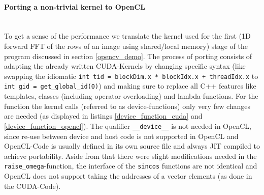 \documentclass[english,11pt,a4paper,table]{article} %
\begin{document}
\paragraph{Porting a non-trivial kernel to OpenCL}\mbox{}\\

To get a sense of the performance we translate the kernel used for the first (1D forward FFT of the rows of an image using shared/local memory) stage of the program discussed in section \ref{opencv_demo}.
The process of porting consists of adapting the already written CUDA-Kernels by changing specific syntax (like swapping the idiomatic \texttt{int tid = blockDim.x * blockIdx.x + threadIdx.x} to \texttt{int gid = get\_global\_id(0)}) and making sure to replace all C++ features like templates, classes (including operator overloading) and lambda-functions.
For the function the kernel calls (referred to as device-functions) only very few changes are needed (as displayed in listings \ref{device_function_cuda} and \ref{device_function_opencl}).
The qualifier \texttt{\_\_device\_\_} is not needed in OpenCL, since re-use between device and host code is not supported in OpenCL and OpenCL-Code is usually defined in its own source file and always JIT compiled to achieve portability.
Aside from that there were slight modifications needed in the \texttt{raise\_omega}-function, the interface of the \texttt{sincos} functions are not identical and OpenCL does not support taking the addresses of a vector elements (as done in the CUDA-Code).
\end{document}
